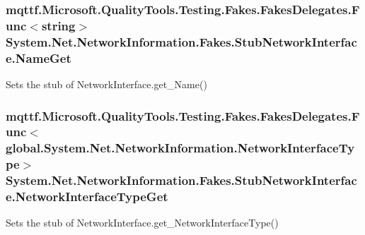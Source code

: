 \hypertarget{class_system_1_1_net_1_1_network_information_1_1_fakes_1_1_stub_network_interface_a069ea01bb45097ef2a5444fc0a6072d2}{
\subsubsection[{Name\-Get}]{\setlength{\rightskip}{0pt plus 5cm}mqttf.\-Microsoft.\-Quality\-Tools.\-Testing.\-Fakes.\-Fakes\-Delegates.\-Func$<$string$>$ System.\-Net.\-Network\-Information.\-Fakes.\-Stub\-Network\-Interface.\-Name\-Get}}\label{class_system_1_1_net_1_1_network_information_1_1_fakes_1_1_stub_network_interface_a069ea01bb45097ef2a5444fc0a6072d2}


Sets the stub of Network\-Interface.\-get\-\_\-\-Name()

\hypertarget{class_system_1_1_net_1_1_network_information_1_1_fakes_1_1_stub_network_interface_a50b63807b4bd3c782b7a11adbca78b89}{
\subsubsection[{Network\-Interface\-Type\-Get}]{\setlength{\rightskip}{0pt plus 5cm}mqttf.\-Microsoft.\-Quality\-Tools.\-Testing.\-Fakes.\-Fakes\-Delegates.\-Func$<$global.\-System.\-Net.\-Network\-Information.\-Network\-Interface\-Type$>$ System.\-Net.\-Network\-Information.\-Fakes.\-Stub\-Network\-Interface.\-Network\-Interface\-Type\-Get}}\label{class_system_1_1_net_1_1_network_information_1_1_fakes_1_1_stub_network_interface_a50b63807b4bd3c782b7a11adbca78b89}


Sets the stub of Network\-Interface.\-get\-\_\-\-Network\-Interface\-Type()

